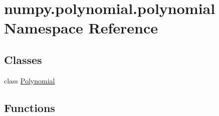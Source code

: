 \hypertarget{namespacenumpy_1_1polynomial_1_1polynomial}{}\section{numpy.\+polynomial.\+polynomial Namespace Reference}
\label{namespacenumpy_1_1polynomial_1_1polynomial}
\subsection*{Classes}
\begin{DoxyCompactItemize}
\item 
class \hyperlink{classnumpy_1_1polynomial_1_1polynomial_1_1Polynomial}{Polynomial}
\end{DoxyCompactItemize}
\subsection*{Functions}
